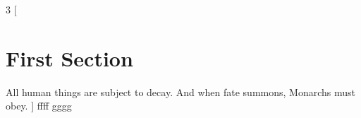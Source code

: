\begin{multicols}{3}
    [
    \section{First Section}
    All human things are subject to decay. And when fate summons, Monarchs must obey.
    ]
    ffff gggg
    \end{multicols}